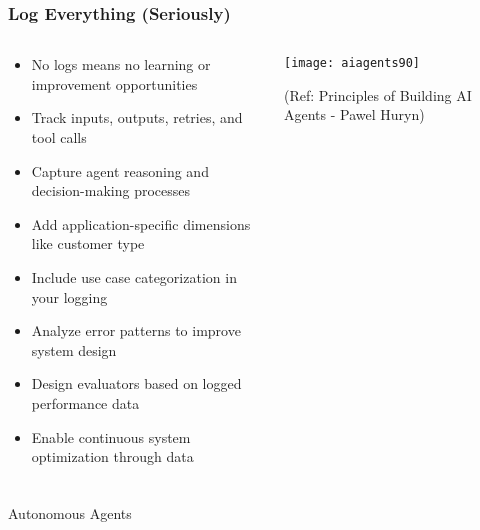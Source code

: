 \begin{frame}[fragile]\frametitle{Log Everything (Seriously)}
\begin{columns}
    \begin{column}[T]{0.6\linewidth}
      \begin{itemize}
		\item No logs means no learning or improvement opportunities
		\item Track inputs, outputs, retries, and tool calls
		\item Capture agent reasoning and decision-making processes
		\item Add application-specific dimensions like customer type
		\item Include use case categorization in your logging
		\item Analyze error patterns to improve system design
		\item Design evaluators based on logged performance data
		\item Enable continuous system optimization through data
	  \end{itemize}
    \end{column}
    \begin{column}[T]{0.4\linewidth}
		\begin{center}
		\texttt{[image: aiagents90]}
		
		{\tiny (Ref: Principles of Building AI Agents - Pawel Huryn)}
		\end{center}	
    \end{column}
  \end{columns}
\end{frame}

\begin{frame}[fragile]\frametitle{}
\begin{center}
{\Large Autonomous Agents}
\end{center}
\end{frame}


